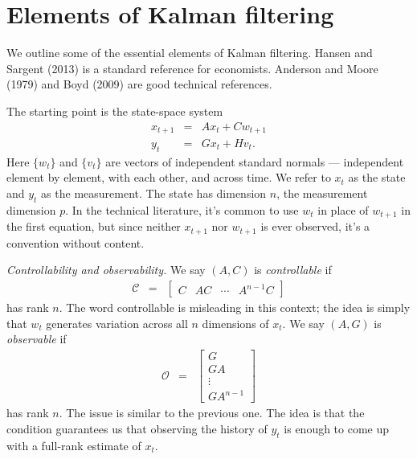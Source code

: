 \documentclass[11pt]{article}
\begin{document}
{\section{Elements of Kalman filtering}
\label{app:kalman}

We outline some of the essential elements of Kalman filtering.
Hansen and Sargent (2013) is a standard reference for economists.
Anderson and Moore (1979) and Boyd (2009) are good technical references.

The starting point is the state-space system
\begin{eqnarray*}
    x_{t+1} &=& A x_t + C w_{t+1} \\
    y_t  &=&  G x_t + H v_t .
\end{eqnarray*}
Here $ \{w_t \}$ and $\{ v_t \}$ are vectors of independent standard normals ---
independent element by element, with each other, and across time.
We refer to $x_t$ as the state and $y_t$ as the measurement.
The state has dimension $n$, the measurement dimension $p$.
In the technical literature,
it's common to use $w_t$ in place of $w_{t+1}$ in the first equation,
but since neither $x_{t+1}$ nor $w_{t+1}$ is ever observed,
it's a convention without content.


{\it Controllability and observability.\/}
We say $(A,C)$ is {\it controllable\/} if
\begin{eqnarray*}
    \mathcal{C} &=&
    \left[
    \begin{array}{cccc}
        C  & A C & \cdots & A^{n-1} C
    \end{array}
    \right]
\end{eqnarray*}
has rank $n$.
The word controllable is misleading in this context;
the idea is simply that $w_t$ generates variation across
all $n$ dimensions of $x_t$.
We say $(A,G)$ is {\it observable\/} if
\begin{eqnarray*}
    \mathcal{O} &=&
    \left[
    \begin{array}{c}
        G \\ G  A  \\ \vdots \\ G  A ^{n-1}
    \end{array}
    \right]
\end{eqnarray*}
has rank $n$.
The issue is similar to the previous one.
The idea is that the condition guarantees us that observing the history of $y_t$
is enough to come up with a full-rank estimate of $x_t$.


}
\end{document}
